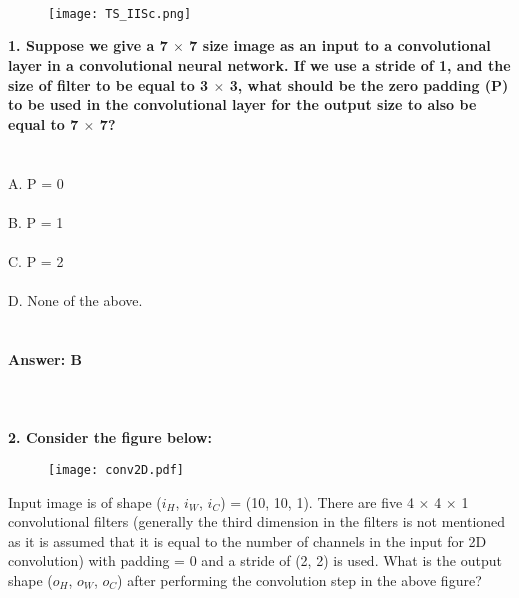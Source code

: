 \documentclass[prl,twocolumn,showpacs,preprintnumbers,superscriptaddress]{revtex4}
\theoremstyle{plain}
\theoremstyle{definition}
\begin{document}
\begin{widetext}
\\
\\
\\

\begin{wrapfigure}
\centering
\end{wrapfigure}
\begin{figure}[h!]
 \begin{right}
  \hfill\texttt{[image: TS\_IISc.png]}
 \end{right}
\end{figure}
\noindent\textbf{1. Suppose we give a 7 $\times$ 7 size image as an input to a convolutional layer in a convolutional neural network. If we use a stride of 1, and the size of filter to be equal to 3 $\times$ 3, what should be the zero padding (P) to be used in the convolutional layer for the output size to also be equal to 7 $\times$ 7?}
\\
\\
\\
A. P = 0
\\
\\
B. P = 1
\\
\\
C. P = 2
\\
\\
D. None of the above.
\\
\\
\\
\textbf{Answer: B}
\\
\\
\\
\\
\textbf{2. Consider the figure below:}
\begin{figure}[H]
\begin{center}
    \texttt{[image: conv2D.pdf]}
\end{center}
\end{figure}
\noindent Input image is of shape ($i_{H}$, $i_{W}$, $i_{C}$) = (10, 10, 1). There are five 4 $\times$ 4 $\times$ 1 convolutional filters (generally the third dimension in the filters is not mentioned as it is assumed that it is equal to the number of channels in the input for 2D convolution)
with padding = 0 and a stride of (2, 2) is used.
What is the output shape ($o_{H}$, $o_{W}$, $o_{C}$) after performing the convolution step in the above figure? 

\end{widetext}
\end{document}
